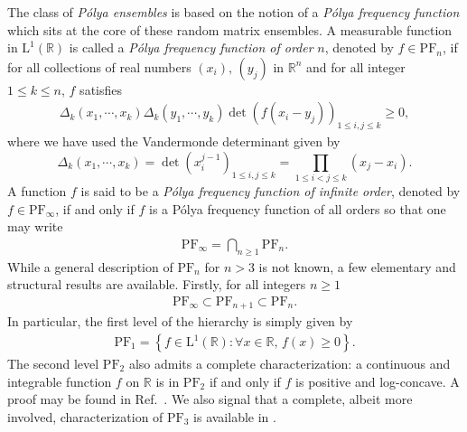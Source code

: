 \documentclass[pdflatex,sn-mathphys-num]{sn-jnl}
\theoremstyle{thmstyleone}
\numberwithin{equation}{section}
\newcommand{\R}{\mathbb{R}}
\begin{document}
The class of \textit{P\'olya ensembles} is based on the notion of a \textit{P\'olya frequency function} which sits at the core of these random matrix ensembles.
A measurable function in $\mathrm{L}^{1}\left ( \R \right )$ is called a \textit{P\'olya frequency function of order} $n$, denoted by $f\in\mathrm{PF}_{n}$, if for all collections of real numbers $(x_{i}),\,(y_{j})$ in $\R^{n}$ and for all integer $1\leq k\leq n$, $f$ satisfies
    \begin{align}
        \Delta_{k}\left ( x_{1},\cdots,x_{k} \right )\Delta_{k}\left ( y_{1},\cdots,y_{k} \right )\det\left ( f\left ( x_{i}-y_{j} \right ) \right )_{1\leq i,j\leq k}\geq 0,
    \end{align}
where we have used the Vandermonde determinant given by
\begin{equation}
    \Delta_{k}\left ( x_{1},\cdots,x_{k} \right )=\det\left(x_{i}^{j-1}\right)_{1\leq i,j\leq k}=\prod_{1\leq i<j\leq k}(x_{j}-x_{i}).
\end{equation}
A function $f$ is said to be a \textit{P\'olya frequency function of infinite order}, denoted by $f\in\mathrm{PF}_{\infty}$, if and only if $f$ is a P\'olya frequency function of all orders so that one may write
    \begin{align}
      \mathrm{PF}_{\infty}=\bigcap\limits_{n\geq 1}\mathrm{PF}_{n}.  
    \end{align}
While a general description of $\mathrm{PF}_{n}$ for $n>3$ is not known, a few elementary and structural results are available. Firstly, for all integers $n\geq 1$ 
\begin{align}
    \mathrm{PF}_{\infty}\subset\mathrm{PF}_{n+1}\subset\mathrm{PF}_{n}.
\end{align}
In particular, the first level of the hierarchy is simply given by
\begin{align}
    \mathrm{PF}_{1}=\left \{ f\in\mathrm{L}^{1}\left ( \R \right ):\forall x\in\R,\, f\left ( x \right )\geq 0 \right \}.
\end{align}
The second level $\mathrm{PF}_{2}$ also admits a complete characterization: a continuous and integrable function $f$ on $\R$ is in $\mathrm{PF}_{2}$ if and only if $f$ is positive and log-concave. A proof may be found in Ref.~\cite[Section~11]{saumardLogconcavityStrongLogconcavity2014}. We also signal that a complete, albeit more involved, characterization of $\mathrm{PF}_{3}$ is available in \cite{WeinbergerCharacterizationPolyaFrequency1983}.
\end{document}
